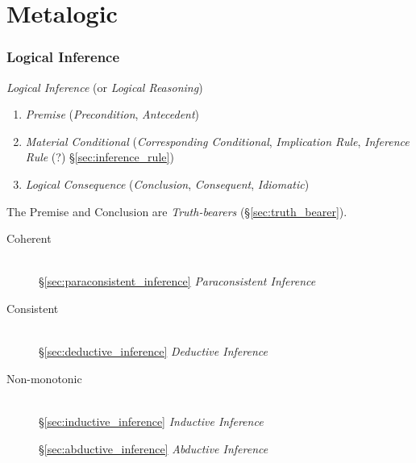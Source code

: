 \part{Metalogic}\label{sec:metalogic}

\section{Logical Inference}\label{sec:logical_inference}

\emph{Logical Inference} (or \emph{Logical Reasoning})

\begin{enumerate}
\item \emph{Premise} (\emph{Precondition}, \emph{Antecedent})

\item \emph{Material Conditional} (\emph{Corresponding Conditional},
  \emph{Implication Rule}, \emph{Inference Rule} (?)
  \S\ref{sec:inference_rule})

\item \emph{Logical Consequence} (\emph{Conclusion},
  \emph{Consequent}, \emph{Idiomatic})
\end{enumerate}

The Premise and Conclusion are \emph{Truth-bearers}
(\S\ref{sec:truth_bearer}).

\begin{description}
\item [Coherent] \hfill\\
    \S\ref{sec:paraconsistent_inference}
    \emph{Paraconsistent Inference}

\item [Consistent] \hfill\\
    \S\ref{sec:deductive_inference} \emph{Deductive Inference}

\item [Non-monotonic] \hfill\\
    \S\ref{sec:inductive_inference} \emph{Inductive Inference}

    \S\ref{sec:abductive_inference} \emph{Abductive Inference}

\end{description}

